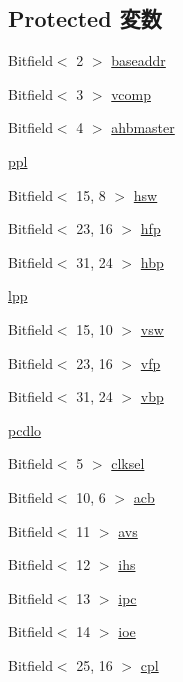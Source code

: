 \subsection*{Protected 変数}
\begin{DoxyCompactItemize}
\item 
Bitfield$<$ 2 $>$ \hyperlink{classPl111_af9a4a8a02ab8754e43bc287b6c2945b6}{baseaddr}
\item 
Bitfield$<$ 3 $>$ \hyperlink{classPl111_ae6e8ea09b21dba5208f69d49b81f9d2a}{vcomp}
\item 
Bitfield$<$ 4 $>$ \hyperlink{classPl111_a5a24e804d6f5f2b797e631ae3b93577c}{ahbmaster}
\item 
\hyperlink{classPl111_ab221ac2ac5d05273785494a20f07491a}{ppl}
\item 
Bitfield$<$ 15, 8 $>$ \hyperlink{classPl111_aa182f542482835ddda6ef4d523791f30}{hsw}
\item 
Bitfield$<$ 23, 16 $>$ \hyperlink{classPl111_af163f5f60393a40cd898b5489d3e5901}{hfp}
\item 
Bitfield$<$ 31, 24 $>$ \hyperlink{classPl111_a49df0f89b9fa1e135522674810b9fa1e}{hbp}
\item 
\hyperlink{classPl111_a6884856f16e806374ba109eb1047d71d}{lpp}
\item 
Bitfield$<$ 15, 10 $>$ \hyperlink{classPl111_aabfa1a418a1d961d706322ca00849cdc}{vsw}
\item 
Bitfield$<$ 23, 16 $>$ \hyperlink{classPl111_ae4f40002505b03a4890ef738817b9cc1}{vfp}
\item 
Bitfield$<$ 31, 24 $>$ \hyperlink{classPl111_ac417740b549a1c71499e509490dea6ea}{vbp}
\item 
\hyperlink{classPl111_a188d5098048b3b3a6fd44a4ecd56c797}{pcdlo}
\item 
Bitfield$<$ 5 $>$ \hyperlink{classPl111_a1347b604581d58e4a1976abce95168d7}{clksel}
\item 
Bitfield$<$ 10, 6 $>$ \hyperlink{classPl111_aec6c41a8f55632082142969f007f3584}{acb}
\item 
Bitfield$<$ 11 $>$ \hyperlink{classPl111_abf78b497cfd8378559b939137abed8d5}{avs}
\item 
Bitfield$<$ 12 $>$ \hyperlink{classPl111_ae5c21231f6311c0299549cda5105cf33}{ihs}
\item 
Bitfield$<$ 13 $>$ \hyperlink{classPl111_ae88299d5dc68d6f0f720586f30ad627a}{ipc}
\item 
Bitfield$<$ 14 $>$ \hyperlink{classPl111_a3a6ed57843b9f0709822190663f6477b}{ioe}
\item 
Bitfield$<$ 25, 16 $>$ \hyperlink{classPl111_af7fd8d8db804fb907b87827d17924085}{cpl}

\end{DoxyCompactItemize}
